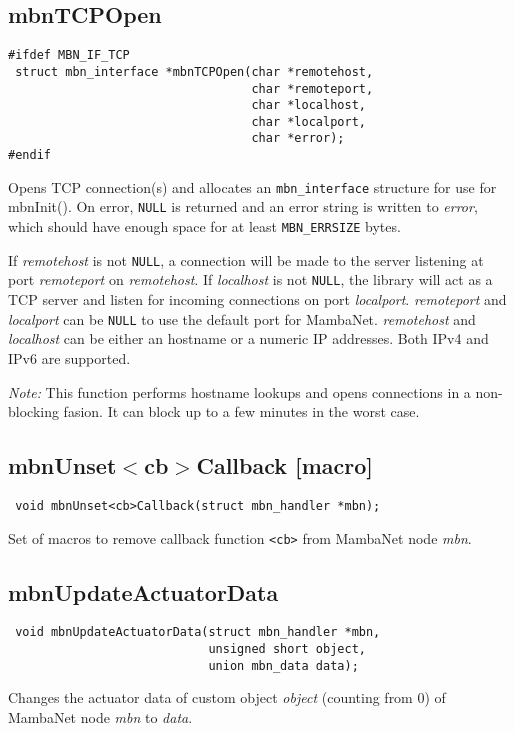 \documentclass[a4paper]{report}
\begin{document}
\subsection{mbnTCPOpen}
\begin{verbatim}
#ifdef MBN_IF_TCP
 struct mbn_interface *mbnTCPOpen(char *remotehost,
                                  char *remoteport,
                                  char *localhost,
                                  char *localport,
                                  char *error);
#endif
\end{verbatim}
Opens TCP connection(s) and allocates an \verb|mbn_interface| structure for use for mbnInit(). On error, \verb|NULL| is returned and an error string is written to \textit{error}, which should have enough space for at least \verb|MBN_ERRSIZE| bytes.

If \textit{remotehost} is not \verb|NULL|, a connection will be made to the server listening at port \textit{remoteport} on \textit{remotehost}. If \textit{localhost} is not \verb|NULL|, the library will act as a TCP server and listen for incoming connections on port \textit{localport}. \textit{remoteport} and \textit{localport} can be \verb|NULL| to use the default port for MambaNet. \textit{remotehost} and \textit{localhost} can be either an hostname or a numeric IP addresses. Both IPv4 and IPv6 are supported.

\emph{Note:} This function performs hostname lookups and opens connections in a non-blocking fasion. It can block up to a few minutes in the worst case.


\subsection{mbnUnset$<$cb$>$Callback \footnotesize{[macro]}}
\begin{verbatim}
 void mbnUnset<cb>Callback(struct mbn_handler *mbn);
\end{verbatim}
Set of macros to remove callback function \verb|<cb>| from MambaNet node \textit{mbn}. 


\subsection{mbnUpdateActuatorData}
\begin{verbatim}
 void mbnUpdateActuatorData(struct mbn_handler *mbn,
                            unsigned short object,
                            union mbn_data data);
\end{verbatim}
Changes the actuator data of custom object \textit{object} (counting from 0) of MambaNet node \textit{mbn} to \textit{data}.
\end{document}
